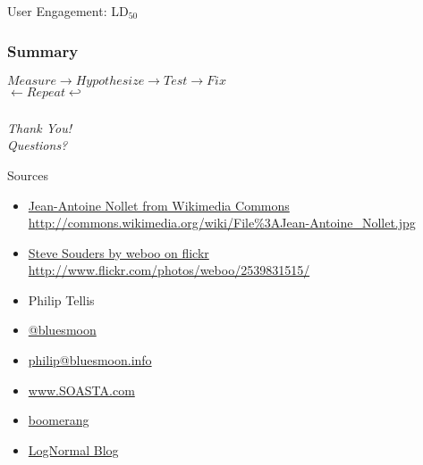 \documentclass{beamer}
\newcommand{\innersplash}[1]{
  \begin{center}
    \Large \textrm{\textit{ #1 } }
  \end{center}
}
\newcommand{\splashslide}[2][{}]{
  \begin{frame}
  \frametitle{#1}
  \innersplash{#2}
  \end{frame}
}
\newcommand{\textsubscript}[1]{\ensuremath{_{\textrm{#1}}}}
\begin{document}
\begin{frame}{User Engagement: LD\textsubscript{50}}
\end{frame}

\splashslide[Summary]{$ Measure \rightarrow Hypothesize \rightarrow Test \rightarrow Fix $ \\ $ \leftarrow Repeat \hookleftarrow $}

\splashslide{Thank You! \\ Questions?}

\begin{frame}{Sources}
  \begin{itemize}
  \item \href{http://commons.wikimedia.org/wiki/File\%3AJean-Antoine_Nollet.jpg}{Jean-Antoine Nollet from Wikimedia Commons \\ \tiny http://commons.wikimedia.org/wiki/File\%3AJean-Antoine\_Nollet.jpg}
  \item \href{http://www.flickr.com/photos/weboo/2539831515/}{Steve Souders by weboo on flickr \\ \tiny http://www.flickr.com/photos/weboo/2539831515/}
  \end{itemize}
\end{frame}

\begin{frame}
  \begin{itemize}
  \item Philip Tellis
  \item \href{http://twitter.com/bluesmoon}{@bluesmoon}
  \item \href{http://bluesmoon.info/}{philip@bluesmoon.info}
  \item \href{http://www.soasta.com/}{www.SOASTA.com}
  \item \href{http://lognormal.github.com/boomerang/doc/}{boomerang}
  \item \href{http://www.lognormal.com/blog/}{LogNormal Blog}
  \end{itemize}
\end{frame}
\end{document}
